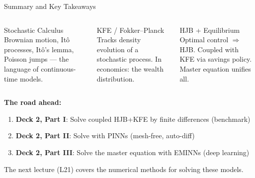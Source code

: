 \documentclass[aspectratio=169,11pt]{beamer}
\newcommand{\emphc}[1]{\textcolor{harvardcrimson}{#1}}
\begin{document}
\begin{frame}{Summary and Key Takeaways}
\begin{columns}[T]
\begin{block}{Stochastic Calculus}
\centering\small
\vspace{0.2em}
Brownian motion, It\^o processes, It\^o's lemma, Poisson jumps --- the \emphc{language} of continuous-time models.
\vspace{0.2em}
\end{block}

\begin{block}{KFE / Fokker--Planck}
\centering\small
\vspace{0.2em}
Tracks \emphc{density evolution} of a stochastic process. In economics: the wealth distribution.
\vspace{0.2em}
\end{block}

\begin{block}{HJB + Equilibrium}
\centering\small
\vspace{0.2em}
Optimal control $\Rightarrow$ HJB. Coupled with KFE via savings policy. Master equation unifies all.
\vspace{0.2em}
\end{block}
\end{columns}

\vspace{0.3em}
\textbf{The road ahead:}
\begin{enumerate}\itemsep1pt
    \item \textbf{Deck 2, Part I}: Solve coupled HJB+KFE by \emphc{finite differences} (benchmark)
    \item \textbf{Deck 2, Part II}: Solve with \emphc{PINNs} (mesh-free, auto-diff)
    \item \textbf{Deck 2, Part III}: Solve the \emphc{master equation} with EMINNs (deep learning)
\end{enumerate}

\vspace{0.2em}
\begin{center}
\colorbox{uzhgreylight}{\parbox{0.6\textwidth}{\centering\small
The next lecture (L21) covers the numerical methods for solving these models.}}
\end{center}
\end{frame}
\end{document}
